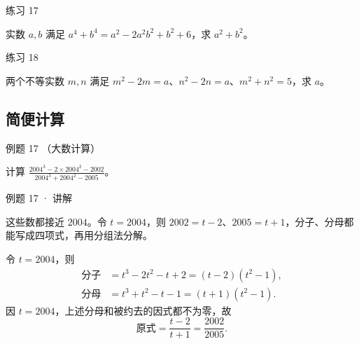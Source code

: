 
\begin{problem}{练习 17}

实数 $a,b$ 满足 $a^4+b^4=a^2-2a^2b^2+b^2+6$，求 $a^2+b^2$。

\end{problem}

\begin{problem}{练习 18}

两个不等实数 $m,n$ 满足 $m^2-2m=a$、$n^2-2n=a$、$m^2+n^2=5$，求 $a$。

\end{problem}


\subsection{简便计算}



\begin{problem}{例题 17 （大数计算）}

计算 $\displaystyle\frac{2004^3-2\times2004^2-2002}{2004^3+2004^2-2005}$。

\end{problem}


\begin{solution}{例题 17 · 讲解}

\think 这些数都接近 $2004$。令 $t=2004$，则 $2002=t-2$、$2005=t+1$，分子、分母都能写成四项式，再用分组法分解。

\solve 令 $t=2004$，则
\begin{align*}
\text{分子}&=t^3-2t^2-t+2=(t-2)(t^2-1),\\
\text{分母}&=t^3+t^2-t-1=(t+1)(t^2-1).
\end{align*}
因 $t=2004$，上述分母和被约去的因式都不为零，故
\[\text{原式}=\frac{t-2}{t+1}=\frac{2002}{2005}.\]


\end{solution}



